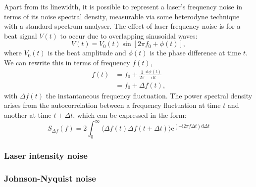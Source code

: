 Apart from its linewidth, it is possible to represent a laser's frequency noise in terms of its noise spectral density, measurable via some heterodyne technique with a standard spectrum analyser. The effect of laser frequency noise is for a beat signal $V \left( t \right)$ to occur due to overlapping sinusoidal waves:
\begin{equation}
  V \left( t \right) = V_0 \left( t \right) \sin \left[ 2 \pi f_0 + \phi \left( t \right) \right],
\end{equation}
where $V_0 \left( t \right)$ is the beat amplitude and $\phi \left( t \right)$ is the phase difference at time $t$. We can rewrite this in terms of frequency $f \left( t \right)$,
\begin{equation}
  \begin{split}
    f \left( t \right) &= f_0 + \frac{1}{2 \pi} \frac{\text{d} \phi \left( t \right)}{\text{d} t} \\
                       &= f_0 + \Delta f \left( t \right),
  \end{split}
\end{equation}
with $\Delta f \left( t \right)$ the instantaneous frequency fluctuation. The power spectral density arises from the autocorrelation between a frequency fluctuation at time $t$ and another at time $t + \Delta t$, which can be expressed in the form:
\begin{equation}
  S_{\Delta f} \left( f \right) = 2 \int^{\infty}_{0} \langle \Delta f \left( t \right) \Delta f \left( t + \Delta t \right) \rangle \text{e}^{\left( -\text{i2}\pi f \Delta t \right) \text{d}\Delta t}
\end{equation}




\subsubsection{Laser intensity noise}

\subsubsection{Johnson-Nyquist noise}

